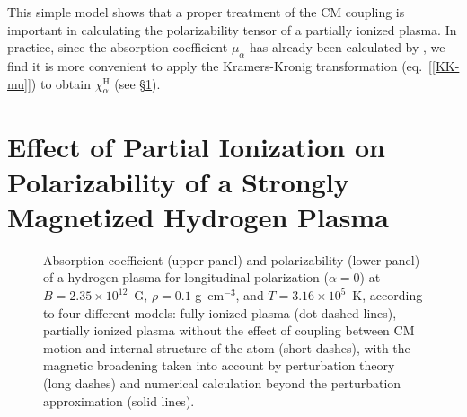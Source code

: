 \documentclass{emulateapj}
\newcommand{\gcc}{\mbox{g cm$^{-3}$}}
\newcommand{\chiH}{\chi^\mathrm{H}}
\begin{document}
This simple model shows that a proper treatment of the CM coupling 
is important in calculating the polarizability tensor of a partially
ionized plasma. In practice, since the absorption coefficient 
$\mu_\alpha$ has already been calculated by \citet{PC03,PC04}, 
we find it is more convenient to apply the Kramers-Kronig
transformation (eq.~[\ref{KK-mu}]) to obtain $\chiH_\alpha$
(see \S\ref{sect:chi-real}). 

\section{Effect of Partial Ionization on Polarizability of a Strongly
Magnetized Hydrogen Plasma}
\label{sect:chi-real}

\begin{figure}
\caption{Absorption coefficient (upper panel) and polarizability
(lower panel) of a hydrogen plasma 
for longitudinal polarization ($\alpha=0$) at $B=2.35\times10^{12}$~G,
$\rho=0.1$ \gcc, and $T=3.16\times10^5$~K, according to four
different models: fully ionized plasma (dot-dashed lines),
partially ionized plasma without the effect of coupling 
between CM motion and internal structure of the atom (short dashes),
with the magnetic broadening taken into account by perturbation
theory (long dashes) and numerical calculation 
beyond the perturbation approximation (solid lines).
\label{fig:kkpert0}}
\end{figure}
\end{document}
